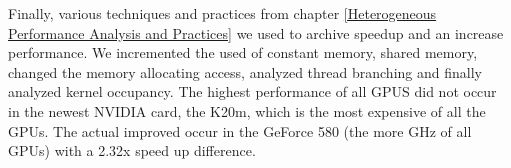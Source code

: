  \vspace{3.5em}

Finally, various techniques and practices from chapter \ref{Heterogeneous Performance Analysis and Practices} we used to archive speedup and an increase performance. We incremented the used of constant memory, shared memory, changed the memory allocating access, analyzed thread branching and finally analyzed kernel occupancy. The highest performance of all GPUS did not occur in the newest NVIDIA card, the K20m, which is the most expensive of all the GPUs. The actual improved occur in the GeForce 580 (the more GHz of all GPUs) with a 2.32x speed up difference.
  
